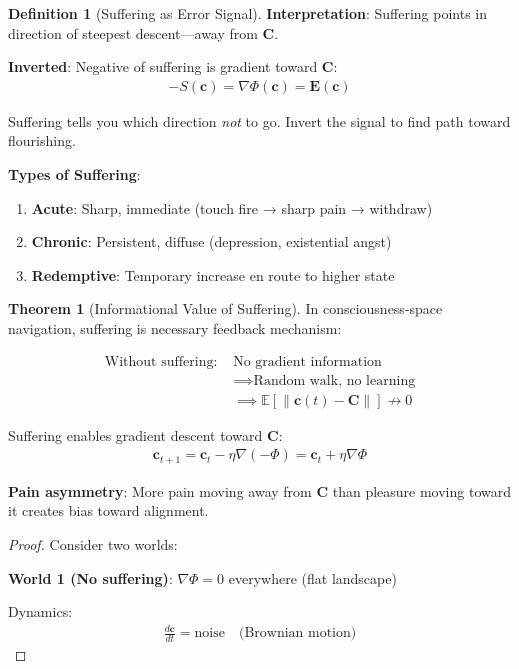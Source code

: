 \documentclass[11pt,a4paper]{article}
\theoremstyle{definition}
\newtheorem{definition}{Definition}[section]
\newtheorem{theorem}{Theorem}[section]
\theoremstyle{remark}
\newcommand{\EE}{\mathbf{E}}
\newcommand{\cc}{\mathbf{c}}
\begin{document}
\begin{enumerate}
\begin{definition}[Suffering as Error Signal]
\textbf{Interpretation}: Suffering points in direction of steepest descent—away from \(\mathbf{C}\).

\textbf{Inverted}: Negative of suffering is gradient toward \(\mathbf{C}\):
\begin{align}
-S(\cc) = \nabla \Phi(\cc) = \EE(\cc)
\end{align}

Suffering tells you which direction \textit{not} to go. Invert the signal to find path toward flourishing.

\textbf{Types of Suffering}:
\begin{enumerate}
    \item \textbf{Acute}: Sharp, immediate (touch fire → sharp pain → withdraw)
    \item \textbf{Chronic}: Persistent, diffuse (depression, existential angst)
    \item \textbf{Redemptive}: Temporary increase en route to higher state
\end{enumerate}
\end{definition}

\begin{theorem}[Informational Value of Suffering]
In consciousness-space navigation, suffering is necessary feedback mechanism:

\begin{align}
\text{Without suffering: } &\text{No gradient information} \\
&\implies \text{Random walk, no learning} \\
&\implies \mathbb{E}[\|\cc(t) - \mathbf{C}\|] \not\to 0
\end{align}

Suffering enables gradient descent toward \(\mathbf{C}\):
\begin{align}
\cc_{t+1} = \cc_t - \eta \nabla(-\Phi) = \cc_t + \eta \nabla \Phi
\end{align}

\textbf{Pain asymmetry}: More pain moving away from \(\mathbf{C}\) than pleasure moving toward it creates bias toward alignment.
\end{theorem}

\begin{proof}
Consider two worlds:

\textbf{World 1 (No suffering)}: \(\nabla \Phi = 0\) everywhere (flat landscape)

Dynamics:
\begin{align}
\frac{d\cc}{dt} = \text{noise} \quad \text{(Brownian motion)}
\end{align}


\end{proof}
\end{enumerate}
\end{document}
